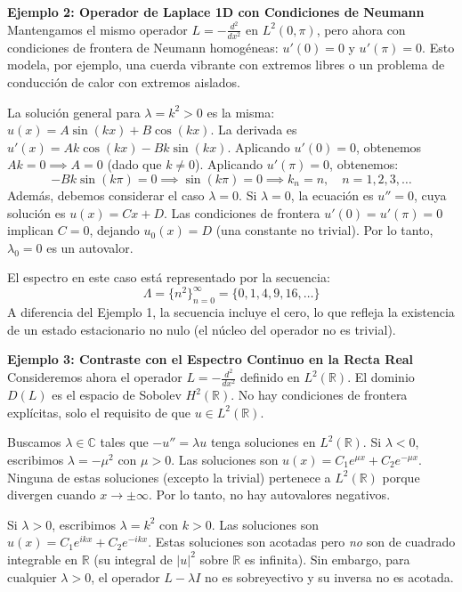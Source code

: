\documentclass[a4paper]{article}
\begin{document}
\textbf{Ejemplo 2: Operador de Laplace 1D con Condiciones de Neumann}
Mantengamos el mismo operador $L = -\frac{d^2}{dx^2}$ en $L^2(0, \pi)$, pero ahora con condiciones de frontera de Neumann homogéneas: $u'(0) = 0$ y $u'(\pi) = 0$. Esto modela, por ejemplo, una cuerda vibrante con extremos libres o un problema de conducción de calor con extremos aislados.

La solución general para $\lambda = k^2 > 0$ es la misma: $u(x) = A \sin(kx) + B \cos(kx)$.
La derivada es $u'(x) = Ak \cos(kx) - Bk \sin(kx)$.
Aplicando $u'(0) = 0$, obtenemos $Ak = 0 \implies A = 0$ (dado que $k \neq 0$).
Aplicando $u'(\pi) = 0$, obtenemos:
$$ -Bk \sin(k\pi) = 0 \implies \sin(k\pi) = 0 \implies k_n = n, \quad n = 1, 2, 3, \dots $$
Además, debemos considerar el caso $\lambda = 0$. Si $\lambda = 0$, la ecuación es $u'' = 0$, cuya solución es $u(x) = Cx + D$. Las condiciones de frontera $u'(0) = u'(\pi) = 0$ implican $C = 0$, dejando $u_0(x) = D$ (una constante no trivial). Por lo tanto, $\lambda_0 = 0$ es un autovalor.

El espectro en este caso está representado por la secuencia:
$$ \Lambda = \{n^2\}_{n=0}^{\infty} = \{0, 1, 4, 9, 16, \dots\} $$
A diferencia del Ejemplo 1, la secuencia incluye el cero, lo que refleja la existencia de un estado estacionario no nulo (el núcleo del operador no es trivial).

\textbf{Ejemplo 3: Contraste con el Espectro Continuo en la Recta Real}
Consideremos ahora el operador $L = -\frac{d^2}{dx^2}$ definido en $L^2(\mathbb{R})$. El dominio $D(L)$ es el espacio de Sobolev $H^2(\mathbb{R})$. No hay condiciones de frontera explícitas, solo el requisito de que $u \in L^2(\mathbb{R})$.

Buscamos $\lambda \in \mathbb{C}$ tales que $-u'' = \lambda u$ tenga soluciones en $L^2(\mathbb{R})$.
Si $\lambda < 0$, escribimos $\lambda = -\mu^2$ con $\mu > 0$. Las soluciones son $u(x) = C_1 e^{\mu x} + C_2 e^{-\mu x}$. Ninguna de estas soluciones (excepto la trivial) pertenece a $L^2(\mathbb{R})$ porque divergen cuando $x \to \pm \infty$. Por lo tanto, no hay autovalores negativos.

Si $\lambda > 0$, escribimos $\lambda = k^2$ con $k > 0$. Las soluciones son $u(x) = C_1 e^{ikx} + C_2 e^{-ikx}$. Estas soluciones son acotadas pero \textit{no} son de cuadrado integrable en $\mathbb{R}$ (su integral de $|u|^2$ sobre $\mathbb{R}$ es infinita). Sin embargo, para cualquier $\lambda > 0$, el operador $L - \lambda I$ no es sobreyectivo y su inversa no es acotada. 
\end{document}
